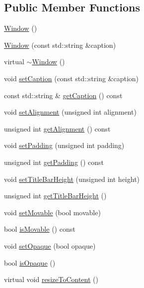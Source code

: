 \subsection*{Public Member Functions}
\begin{DoxyCompactItemize}
\item 
\hyperlink{classgcn_1_1Window_a8872caddfbb6c6ab1c6e1a652be10dbd}{Window} ()
\item 
\hyperlink{classgcn_1_1Window_aca415f0a552927e29f4939bd7356d609}{Window} (const std\+::string \&caption)
\item 
virtual \hyperlink{classgcn_1_1Window_a88117e78c97004cc545d11fbc8bbee14}{$\sim$\+Window} ()
\item 
void \hyperlink{classgcn_1_1Window_a330738fb1fad89e4f698c7105cb6e2c9}{set\+Caption} (const std\+::string \&caption)
\item 
const std\+::string \& \hyperlink{classgcn_1_1Window_ad76320f18fa770b619b1e10002481c71}{get\+Caption} () const 
\item 
void \hyperlink{classgcn_1_1Window_a724060c494d787e7787da06d26a6754b}{set\+Alignment} (unsigned int alignment)
\item 
unsigned int \hyperlink{classgcn_1_1Window_a7435ffabed21f8ee2e7167d19337015a}{get\+Alignment} () const 
\item 
void \hyperlink{classgcn_1_1Window_af3d4c9a42d8d3a073b8f7a230571cb36}{set\+Padding} (unsigned int padding)
\item 
unsigned int \hyperlink{classgcn_1_1Window_addd3c38a66189ad4e8e3a6e1fb41f2eb}{get\+Padding} () const 
\item 
void \hyperlink{classgcn_1_1Window_a2a1782028d1f47e1dbc2b68200ff43d9}{set\+Title\+Bar\+Height} (unsigned int height)
\item 
unsigned int \hyperlink{classgcn_1_1Window_a2093c19a399a3235f17fd6465ac6ddc9}{get\+Title\+Bar\+Height} ()
\item 
void \hyperlink{classgcn_1_1Window_a5a6828f5cacb4e64c1457dbe7481f870}{set\+Movable} (bool movable)
\item 
bool \hyperlink{classgcn_1_1Window_ae5d164e2848d420fda6cb3d6505d2e23}{is\+Movable} () const 
\item 
void \hyperlink{classgcn_1_1Window_a13ac3ee8839e888fbd22fb98785d57ce}{set\+Opaque} (bool opaque)
\item 
bool \hyperlink{classgcn_1_1Window_afd6f988ede4555fce9f1299c636c3886}{is\+Opaque} ()
\item 
virtual void \hyperlink{classgcn_1_1Window_ae872e849f4a1ac39dfd549ec86ac8fb0}{resize\+To\+Content} ()

\end{DoxyCompactItemize}
